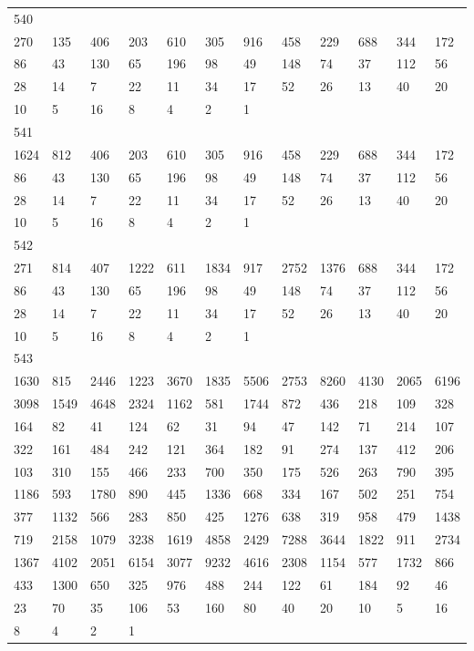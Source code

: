 \begin{longtable}{llllllllllll}
540&&&&&&&&&&&\\
270& 135& 406& 203& 610& 305& 916& 458& 229& 688& 344& 172\\
86& 43& 130& 65& 196& 98& 49& 148& 74& 37& 112& 56\\
28& 14& 7& 22& 11& 34& 17& 52& 26& 13& 40& 20\\
10& 5& 16& 8& 4& 2& 1& \\

541&&&&&&&&&&&\\
1624& 812& 406& 203& 610& 305& 916& 458& 229& 688& 344& 172\\
86& 43& 130& 65& 196& 98& 49& 148& 74& 37& 112& 56\\
28& 14& 7& 22& 11& 34& 17& 52& 26& 13& 40& 20\\
10& 5& 16& 8& 4& 2& 1& \\

542&&&&&&&&&&&\\
271& 814& 407& 1222& 611& 1834& 917& 2752& 1376& 688& 344& 172\\
86& 43& 130& 65& 196& 98& 49& 148& 74& 37& 112& 56\\
28& 14& 7& 22& 11& 34& 17& 52& 26& 13& 40& 20\\
10& 5& 16& 8& 4& 2& 1& \\

543&&&&&&&&&&&\\
1630& 815& 2446& 1223& 3670& 1835& 5506& 2753& 8260& 4130& 2065& 6196\\
3098& 1549& 4648& 2324& 1162& 581& 1744& 872& 436& 218& 109& 328\\
164& 82& 41& 124& 62& 31& 94& 47& 142& 71& 214& 107\\
322& 161& 484& 242& 121& 364& 182& 91& 274& 137& 412& 206\\
103& 310& 155& 466& 233& 700& 350& 175& 526& 263& 790& 395\\
1186& 593& 1780& 890& 445& 1336& 668& 334& 167& 502& 251& 754\\
377& 1132& 566& 283& 850& 425& 1276& 638& 319& 958& 479& 1438\\
719& 2158& 1079& 3238& 1619& 4858& 2429& 7288& 3644& 1822& 911& 2734\\
1367& 4102& 2051& 6154& 3077& 9232& 4616& 2308& 1154& 577& 1732& 866\\
433& 1300& 650& 325& 976& 488& 244& 122& 61& 184& 92& 46\\
23& 70& 35& 106& 53& 160& 80& 40& 20& 10& 5& 16\\
8& 4& 2& 1& \\


\end{longtable}
